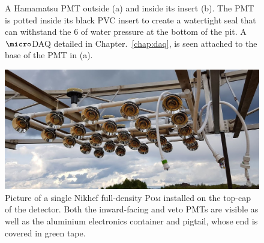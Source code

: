 \begin{figure} %
    \centering
    \quad
    \caption[Pictures of the Madison PMT assembly]
    {A Hamamatsu PMT outside (a) and inside its insert (b). The PMT is potted inside its black PVC
        insert to create a watertight seal that can withstand the \unit{6}{} of water
        pressure at the bottom of the pit. A $\micro$DAQ detailed in Chapter.~\ref{chap:daq}, is
        seen attached to the base of the PMT in (a).}
    \label{fig:madison_pmt_assembly}
\end{figure}

\begin{figure} %
    \includegraphics[width=\textwidth]{diagrams/4-chips/single_plane.pdf}
    \caption[Picture of a Nikhef Planar Optical Module]
    {Picture of a single Nikhef full-density \textsc{Pom} installed on the top-cap of the
        \chipsfive detector. Both the inward-facing and veto PMTs are visible as well as the
        aluminium electronics container and pigtail, whose end is covered in green tape.}
    \label{fig:single_plane}
\end{figure}


